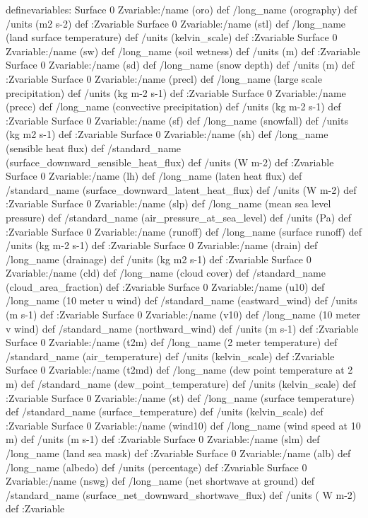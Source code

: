 \begin{ingrid}
definevariables:
Surface 0 Zvariable:/name (oro) def /long_name (orography)  def /units (m2 s-2) def :Zvariable
Surface 0 Zvariable:/name (stl) def /long_name (land surface temperature) def /units (kelvin_scale) def :Zvariable
Surface 0 Zvariable:/name (sw) def /long_name (soil wetness)  def /units (m) def :Zvariable
Surface 0 Zvariable:/name (sd) def /long_name (snow depth) def /units (m) def :Zvariable
Surface 0 Zvariable:/name (precl) def /long_name (large scale precipitation) def /units (kg m-2 s-1) def :Zvariable
Surface 0 Zvariable:/name (precc) def /long_name (convective precipitation) def /units (kg m-2 s-1) def :Zvariable
Surface 0 Zvariable:/name (sf) def /long_name (snowfall) def /units (kg m2 s-1) def :Zvariable
Surface 0 Zvariable:/name (sh) def /long_name (sensible heat flux) def /standard_name (surface_downward_sensible_heat_flux) def /units (W m-2) def :Zvariable
Surface 0 Zvariable:/name (lh) def /long_name (laten heat flux) def /standard_name (surface_downward_latent_heat_flux) def /units (W m-2) def :Zvariable
Surface 0 Zvariable:/name (slp) def /long_name (mean sea level pressure) def /standard_name (air_pressure_at_sea_level) def /units (Pa) def :Zvariable
Surface 0 Zvariable:/name (runoff) def /long_name (surface runoff) def /units (kg m-2 s-1) def :Zvariable
Surface 0 Zvariable:/name (drain) def /long_name (drainage) def /units (kg m2 s-1) def :Zvariable
Surface 0 Zvariable:/name (cld) def /long_name (cloud cover) def /standard_name (cloud_area_fraction) def :Zvariable
Surface 0 Zvariable:/name (u10) def /long_name (10 meter u wind) def /standard_name (eastward_wind) def /units (m s-1) def :Zvariable
Surface 0 Zvariable:/name (v10) def /long_name (10 meter v wind) def /standard_name (northward_wind) def /units (m s-1) def :Zvariable
Surface 0 Zvariable:/name (t2m) def /long_name (2 meter temperature) def /standard_name (air_temperature) def /units (kelvin_scale) def :Zvariable
Surface 0 Zvariable:/name (t2md) def /long_name (dew point temperature at 2 m) def /standard_name (dew_point_temperature) def /units (kelvin_scale) def :Zvariable
Surface 0 Zvariable:/name (st) def /long_name (surface temperature) def /standard_name (surface_temperature) def /units (kelvin_scale) def :Zvariable
Surface 0 Zvariable:/name (wind10) def /long_name (wind speed at 10 m) def /units (m s-1) def :Zvariable
Surface 0 Zvariable:/name (slm) def /long_name (land sea mask) def :Zvariable
Surface 0 Zvariable:/name (alb) def /long_name (albedo) def /units (percentage) def :Zvariable
Surface 0 Zvariable:/name (nswg) def /long_name (net shortwave at ground) def /standard_name (surface_net_downward_shortwave_flux) def /units ( W m-2) def :Zvariable

\end{ingrid}
